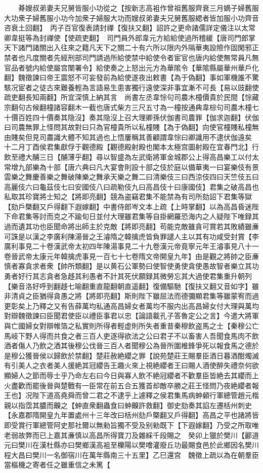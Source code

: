 　　朞嫂叔弟妻夫兄舅皆服小功從之【按新志高袓作曾祖舊服齊衰三月嫡子婦舊服大功衆子婦舊服小功今加衆子婦服大功而嫂叔弟妻夫兄舅舊服緦者皆加服小功齊音咨衰土回翻】　丙子百官復表請封禪【復扶又翻】詔許之更命諸儒詳定儀注以太常卿韋挺等為封禪使【使疏吏翻】　司門員外郎韋元方給給使過所稽緩【唐司門郎掌天下諸門諸關出入往來之籍凡天下之關二十有六所以限内外隔華夷設險作固閑邪正禁者也凡度關者先經刑部司門請過所給使禁中給使令者宦官也唐内給使無常員凡無官品者號内給使屬宫闈署令】給使奏之上怒出元方為華隂令【華隂縣屬華州華戶化翻】魏徵諫曰帝王震怒不可妄發前為給使遂夜出敕書【為于偽翻】事如軍機誰不驚駭况宦者之徒古來難養輕為言語易生患害獨行遠使深非事宜漸不可長【易以豉翻使疏吏翻長知兩翻】所宜深慎上納其言　尚書左丞韋悰句司農木橦價貴於民間【悰藏宗翻句古候翻橦諸容翻木一截也唐式柴方三尺五寸為一橦按通典韋棕句司農木橦七十價百姓四十價奏其隐沒】奏其隐沒上召大理卿孫伏伽書司農罪【伽求迦翻】伏伽曰司農無罪上怪問其故對曰只為官橦貴所以私橦賤【為于偽翻】向使官橦賤私橦無由賤矣但見司農識大體不知其過也上悟屢稱其善顧謂韋悰曰卿識用不逮伏伽遠矣　十二月丁酉侯君集獻俘于觀德殿【觀德殿射殿也閣本太極宫圖射殿在宜春門北】行飲至禮大酺三日【酺薄乎翻】尋以智盛為左武衛將軍金城郡公上得高昌樂工以付太常增九部樂為十部【唐六典曰凡大宴會則設十部之伎於庭以備華夷一曰宴樂伎有景雲樂之舞慶善樂之舞破陳樂之舞承天樂之舞二曰清樂伎三曰西涼伎四曰天竺伎五曰高麗伎六曰龜茲伎七曰安國伎八曰疏勒伎九曰高昌伎十曰康國伎】君集之破高昌也私取其珍寶將士知之【將即亮翻】競為盗竊君集不能禁為有司所劾詔下君集等獄【劾戶槩翻又戶得翻下遐嫁翻】中書侍郎岑文本上疏【上時掌翻】以為高昌昏迷陛下命君集等討而克之不踰旬日並付大理雖君集等自掛網羅恐海内之人疑陛下唯録其過而遺其功也臣聞命將出師主於克敵【將即亮翻】苟能克敵雖貪可賞若其敗績雖亷可誅是以漢之李廣利陳湯晉之王濬隋之韓擒虎皆負罪譴人主以其有功咸受封賞【李廣利事見二十卷漢武帝太初四年陳湯事見二十九卷漢元帝竟寧元年王濬事見八十一卷晉武帝太康元年韓擒虎事見一百七十七卷隋文帝開皇九年】由是觀之將帥之臣亷慎者寡貪求者衆【帥所類翻】是以黄石公軍勢曰使智使勇使貪使愚故智者樂立其功勇者好行其志貪者急趍其利愚者不計其死伏願録其微勞忘其大過使君集重升朝列【樂音洛好呼到翻趍七喻翻重直龍翻朝直遥翻】復備驅馳【復扶又翻又音如字】雖非清貞之臣猶得貪愚之將【將即亮翻】斯則陛下雖屈法而德彌顯君集等雖蒙宥而過更彰矣上乃釋之又有告薛萬均私通高昌婦女者萬均不服内出高昌婦女付大理與萬均對辯魏徵諫曰臣聞君使臣以禮臣事君以忠【論語載孔子答魯定公之言】今遣大將軍與亡國婦女對辯帷箔之私實則所得者輕虚則所失者重昔秦穆飲盗馬之士【秦穆公亡馬岐下野人得而共食之者三百人吏逐得欲法之公曰君子不以畜害人吾聞食馬肉不飲酒者傷人乃飲之酒其後穆公伐晉三百人者聞穆公為晉所圍椎鋒爭死以報食馬之德於是穆公獲晉侯以歸飲於禁翻】楚莊赦絶纓之罪【說苑楚莊王賜羣臣酒日暮酒酣燭滅有引美人之衣者美人援絶其冠纓告王趣火來上視絶纓者王曰賜人酒使醉失禮奈何欲顯婦人之節而辱士乎乃命左右曰今日與寡人飲不絶冠纓者不歡羣臣皆絶去其纓而上火盡歡而罷後晉與楚戰有一臣常在前五合五獲首却敵卒勝之莊王怪問乃夜絶纓者報王也】况陛下道高堯舜而曾二君之不逮乎上遽釋之侯君集馬病蚛顙行軍總管趙元楷親以指霑其膿而齅之【蚛直衆翻蟲食曰蚛齅許救翻】御史劾奏其諂左遷栝州刺史【永嘉郡隋開皇九年置處州十三年改曰栝州劾戶槩翻又戶得翻】高昌之平也諸將皆即受賞行軍總管阿史那社爾以無勑旨獨不受及别勑既下【下遐嫁翻】乃受之所取唯老弱故弊而已上嘉其亷慎以高昌所得寶刀及雜綵千段賜之　癸卯上獵於樊川【酈道元曰樊川在漢杜縣亦曰樊鄉漢高袓至櫟陽以樊噲灌廢丘功最賜食邑於此鄉因名樊川程大昌曰樊川一名御宿川在萬年縣南三十五里】乙巳還宫　魏徵上疏以為在朝羣臣當樞機之寄者任之雖重信之未篤【